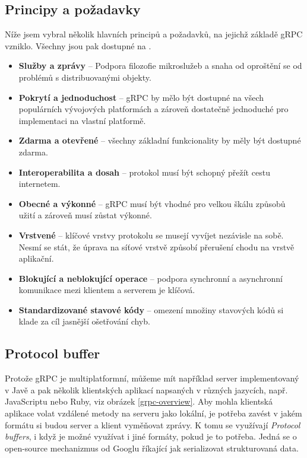\documentclass[thesis=M,czech]{FITthesis}[2019/12/23]
\begin{document}
\subsection{Principy a požadavky}
Níže jsem vybral několik hlavních principů a požadavků, na jejichž základě gRPC vzniklo. Všechny jsou pak dostupné na \cite{grpc_requirements}.
\begin{itemize}
    \item \textbf{Služby a zprávy} -- Podpora filozofie mikroslužeb a snaha od oproštění se od problémů s distribuovanými objekty.
    \item \textbf{Pokrytí a jednoduchost} -- gRPC by mělo být dostupné na všech populárních vývojových platformách a zároveň dostatečně jednoduché pro implementaci na vlastní platformě.
    \item \textbf{Zdarma a otevřené} -- všechny základní funkcionality by měly být dostupné zdarma.
    \item \textbf{Interoperabilita a dosah} -- protokol musí být schopný přežít cestu internetem.
    \item \textbf{Obecné a výkonné} -- gRPC musí být vhodné pro velkou škálu způsobů užití a zároveň musí zůstat výkonné.
    \item \textbf{Vrstvené} -- klíčové vrstvy protokolu se musejí vyvíjet nezávisle na sobě. Nesmí se stát, že úprava na síťové vrstvě způsobí přerušení chodu na vrstvě aplikační.
    \item \textbf{Blokující a neblokující operace} -- podpora synchronní a asynchronní komunikace mezi klientem a serverem je klíčová.
    \item \textbf{Standardizované stavové kódy} -- omezení množiny stavových kódů si klade za cíl jasnější ošetřování chyb.
\end{itemize}

\subsection{Protocol buffer}
Protože gRPC je multiplatformní, můžeme mít například server implementovaný v Javě a pak několik klientských aplikací napsaných v různých jazycích, např. JavaScriptu nebo Ruby, viz obrázek \ref{grpc-overview}. Aby mohla klientská aplikace volat vzdálené metody na serveru jako lokální, je potřeba zavést v jakém formátu si budou server a klient vyměňovat zprávy. K tomu se využívají \textit{Protocol buffers}, i když je možné využívat i jiné formáty, pokud je to potřeba. Jedná se o open-source mechanizmus od Googlu říkající jak serializovat strukturovaná data.
\end{document}
